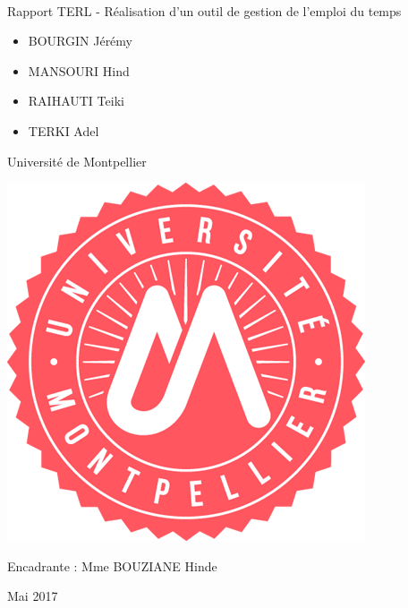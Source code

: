 \documentclass[12pt,a4paper,openany]{memoir}
\begin{document}
%
%
\thispagestyle{empty}
{
	\sffamily
	\centering
	\large

	~\vspace{\fill}

	{\huge Rapport TERL - Réalisation d’un outil de gestion de l’emploi du temps}


	\vspace{2.5cm}

	\begin{itemize}
	    \item BOURGIN Jérémy
	    \item MANSOURI Hind
	    \item RAIHAUTI Teiki
	    \item TERKI Adel
	\end{itemize}

	\vspace{2.5cm}

	Université de Montpellier 
	
	\vspace{2.5cm}
	
	\includegraphics{img/logo.png}

	\vspace{2.5cm}

	Encadrante : Mme BOUZIANE Hinde

	\vspace{\fill}

	Mai 2017
}
\end{document}
